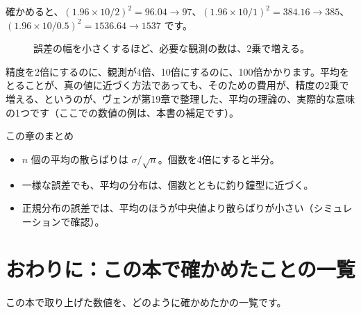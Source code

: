 \documentclass[a4paper,11pt,openany]{ltjsbook}
\begin{document}
確かめると、$(1.96\times10/2)^2=96.04\to97$、$(1.96\times10/1)^2=384.16\to385$、$(1.96\times10/0.5)^2=1536.64\to1537$ です。

\begin{figure}[htbp]
\centering
{}
\caption{誤差の幅を小さくするほど、必要な観測の数は、2乗で増える。}
\end{figure}

精度を2倍にするのに、観測が4倍、10倍にするのに、100倍かかります。平均をとることが、真の値に近づく方法であっても、そのための費用が、精度の2乗で増える、というのが、ヴェンが第19章で整理した、平均の理論の、実際的な意味の1つです（ここでの数値の例は、本書の補足です）。

\begin{pointbox}{この章のまとめ}
\begin{itemize}[leftmargin=*]
\item $n$ 個の平均の散らばりは $\sigma/\sqrt n$。個数を4倍にすると半分。
\item 一様な誤差でも、平均の分布は、個数とともに釣り鐘型に近づく。
\item 正規分布の誤差では、平均のほうが中央値より散らばりが小さい（シミュレーションで確認）。
\end{itemize}
\end{pointbox}

\chapter*{おわりに：この本で確かめたことの一覧}

この本で取り上げた数値を、どのように確かめたかの一覧です。
\end{document}
